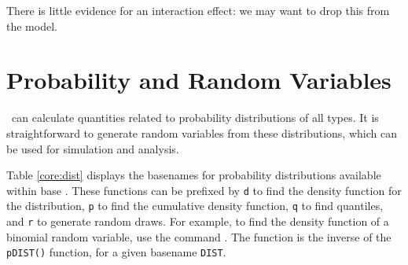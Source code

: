 There is little evidence for an interaction effect: we may want
to drop this from the model.



\section{Probability and Random Variables}

\label{sec:DiscreteDistributions}
\label{sec:probability}

\R\ can calculate quantities related to probability distributions of all types.  
It is straightforward to generate
random variables from these distributions, which can be used 
for simulation and analysis.

Table \ref{core:dist} displays the basenames for probability distributions 
available within base \R.  These functions can be prefixed by {\tt d} to 
find the density function for the distribution, {\tt p} to find the 
cumulative density function, {\tt q} to find quantiles, and {\tt r} to 
generate random draws. For example, to find the density function of a binomial
random variable, use the command .
The  function is the inverse of the 
{\tt pDIST()} function, for a given basename {\tt DIST}. 

\begin{knitrout}
\end{knitrout}



